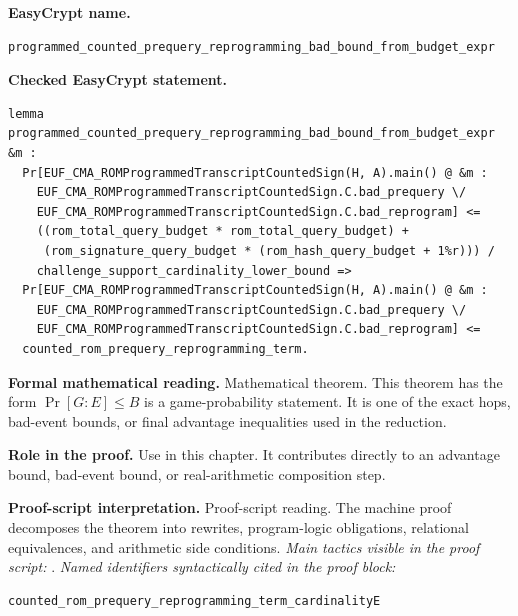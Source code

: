 \begin{formaltheorem}
\noindent\textbf{EasyCrypt name.}
\begin{lstlisting}[language=EasyCrypt,basicstyle=\ttfamily\scriptsize]
programmed_counted_prequery_reprogramming_bad_bound_from_budget_expr
\end{lstlisting}
\noindent\textbf{Checked EasyCrypt statement.}
\begin{lstlisting}[language=EasyCrypt,basicstyle=\ttfamily\scriptsize]
lemma programmed_counted_prequery_reprogramming_bad_bound_from_budget_expr &m :
  Pr[EUF_CMA_ROMProgrammedTranscriptCountedSign(H, A).main() @ &m :
    EUF_CMA_ROMProgrammedTranscriptCountedSign.C.bad_prequery \/
    EUF_CMA_ROMProgrammedTranscriptCountedSign.C.bad_reprogram] <=
    ((rom_total_query_budget * rom_total_query_budget) +
     (rom_signature_query_budget * (rom_hash_query_budget + 1%r))) /
    challenge_support_cardinality_lower_bound =>
  Pr[EUF_CMA_ROMProgrammedTranscriptCountedSign(H, A).main() @ &m :
    EUF_CMA_ROMProgrammedTranscriptCountedSign.C.bad_prequery \/
    EUF_CMA_ROMProgrammedTranscriptCountedSign.C.bad_reprogram] <=
  counted_rom_prequery_reprogramming_term.
\end{lstlisting}
\noindent\textbf{Formal mathematical reading.}
Mathematical theorem. This theorem has the form \(\Pr[G:E] \le B\) is a game-probability statement.  It is one of the exact hops, bad-event bounds, or final advantage inequalities used in the reduction.

\noindent\textbf{Role in the proof.}
Use in this chapter. It contributes directly to an advantage bound, bad-event bound, or real-arithmetic composition step.

\noindent\textbf{Proof-script interpretation.}
Proof-script reading. The machine proof decomposes the theorem into rewrites, program-logic obligations, relational equivalences, and arithmetic side conditions.
\emph{Main tactics visible in the proof script:} .
\emph{Named identifiers syntactically cited in the proof block:}
\begin{lstlisting}[language=EasyCrypt,basicstyle=\ttfamily\scriptsize]
counted_rom_prequery_reprogramming_term_cardinalityE
\end{lstlisting}

\end{formaltheorem}

